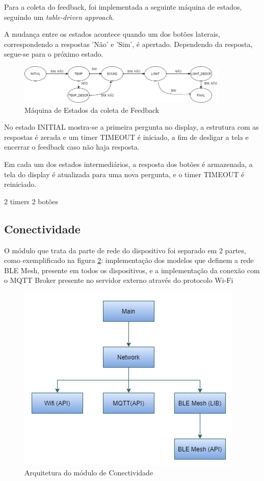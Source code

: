 \documentclass[../monografia.tex]{subfiles}
\begin{document}
Para a coleta do feedback, foi implementada a seguinte máquina de estados, seguindo um \textit{table-driven approach}.

A mudança entre os estados acontece quando um dos botões laterais, correspondendo a respostas 'Não' e 'Sim', é apertado. Dependendo da resposta, segue-se para o próximo estado. 

\begin{figure}[h]
	\centering
	\includegraphics[width=0.9\textwidth]{fsm-feedback.png}
	\caption{Máquina de Estados da coleta de Feedback}
	\label{fig:fsm-feedback}
\end{figure}

No estado INITIAL mostra-se a primeira pergunta no display, a estrutura com as respostas é zerada e um timer TIMEOUT é iniciado, a fim de desligar a tela e encerrar o feedback caso não haja resposta. 

Em cada um dos estados intermediários, a resposta dos botões é armazenada, a tela do display é atualizada para uma nova pergunta, e o timer TIMEOUT é reiniciado. 

2 timers
2 botões

\subsection{Conectividade}

O módulo que trata da parte de rede do dispositivo foi separado em 2 partes, como exemplificado na figura \ref{fig:netw-arch}: implementação dos modelos que definem a rede BLE Mesh, presente em todos os dispositivos, e a implementação da conexão com o MQTT Broker presente no servidor externo através do protocolo Wi-Fi

\begin{figure}[h!]
	\centering
	\includegraphics[]{netw-arch}
	\caption{Arquitetura do módulo de Conectividade} %
	\label{fig:netw-arch}
\end{figure}
\end{document}
